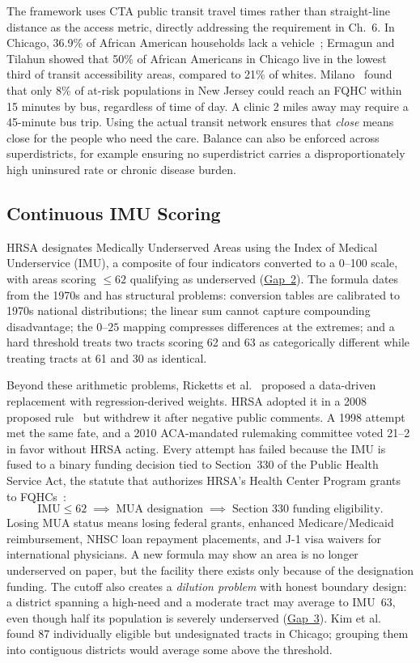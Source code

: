 \documentclass[11pt]{article}
\begin{document}
The framework uses CTA public transit travel times rather than straight-line distance as the access metric, directly addressing the requirement in Ch.~6. In Chicago, 36.9\% of African American households lack a vehicle~\cite{ermagun2020equity}; Ermagun and Tilahun showed that 50\% of African Americans in Chicago live in the lowest third of transit accessibility areas, compared to 21\% of whites. Milano~\cite{milano2025spatial} found that only 8\% of at-risk populations in New Jersey could reach an FQHC within 15 minutes by bus, regardless of time of day. A clinic 2 miles away may require a 45-minute bus trip. Using the actual transit network ensures that \emph{close} means close for the people who need the care. Balance can also be enforced across superdistricts, for example ensuring no superdistrict carries a disproportionately high uninsured rate or chronic disease burden.


\subsection{Continuous IMU Scoring}\label{sec:imu}

HRSA designates Medically Underserved Areas using the Index of Medical Underservice (IMU), a composite of four indicators converted to a 0--100 scale, with areas scoring $\leq 62$ qualifying as underserved (\hyperref[gap:imu]{Gap~2}). The formula dates from the 1970s and has structural problems: conversion tables are calibrated to 1970s national distributions; the linear sum cannot capture compounding disadvantage; the $0$--$25$ mapping compresses differences at the extremes; and a hard threshold treats two tracts scoring 62 and 63 as categorically different while treating tracts at 61 and 30 as identical.

Beyond these arithmetic problems, Ricketts et al.~\cite{ricketts2007designating} proposed a data-driven replacement with regression-derived weights. HRSA adopted it in a 2008 proposed rule~\cite{HRSA2008proposed} but withdrew it after negative public comments. A 1998 attempt met the same fate, and a 2010 ACA-mandated rulemaking committee voted 21--2 in favor without HRSA acting. Every attempt has failed because the IMU is fused to a binary funding decision tied to Section~330 of the Public Health Service Act, the statute that authorizes HRSA's Health Center Program grants to FQHCs~\cite{crs2017healthcenters}:
\[
\text{IMU} \leq 62 \;\implies\; \text{MUA designation} \;\implies\; \text{Section~330 funding eligibility.}
\]
Losing MUA status means losing federal grants, enhanced Medicare/Medicaid reimbursement, NHSC loan repayment placements, and J-1 visa waivers for international physicians. A new formula may show an area is no longer underserved on paper, but the facility there exists only because of the designation funding. The cutoff also creates a \emph{dilution problem} with honest boundary design: a district spanning a high-need and a moderate tract may average to IMU~63, even though half its population is severely underserved (\hyperref[gap:mua]{Gap~3}). Kim et al.~\cite{kim2020uneven} found 87 individually eligible but undesignated tracts in Chicago; grouping them into contiguous districts would average some above the threshold.
\end{document}
